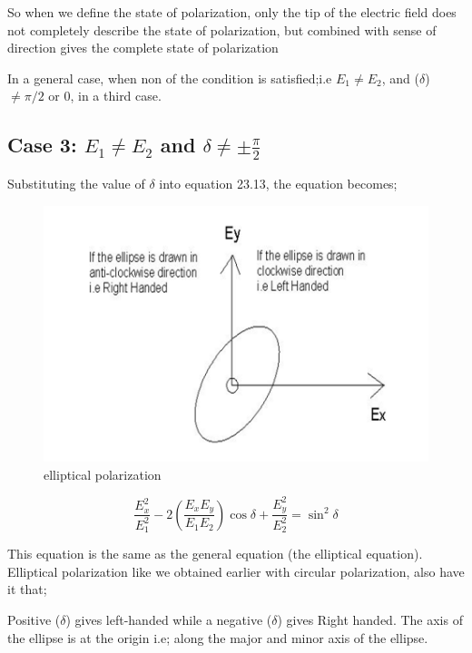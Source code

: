 So when we define the state of polarization, only the tip of the electric field does not completely describe the state of polarization, but combined with sense of direction gives the complete state of polarization

In a general case, when non of the condition is satisfied;i.e $ E_1 \neq E_2$, and ($\delta$)$ \neq \pi/2$ or $ 0 $, in a third case.

\subsection{Case 3: $ E_1 \neq E_2 $ and $\delta \neq \pm \frac{\pi}{2}$}
Substituting the value of $\delta$ into equation 23.13, the equation becomes;
\begin{figure}[h]
\centering
\includegraphics[width=.8\linewidth]{./graphics/ellipse}
\caption{elliptical polarization}
\end{figure}

\begin{equation}
\frac{E_{x}^2}{E_{1}^2} -2(\frac{E_{x}E_{y}}{E_{1}E_{2}})\cos\delta + \frac{E_{y}^2}{E_{2}^2} =\sin^2 \delta
\end{equation}

This equation is the same as the general equation (the elliptical equation). Elliptical polarization like we obtained earlier with circular polarization, also have it that;

Positive ($\delta$) gives left-handed while a negative ($\delta$) gives Right handed. The axis of the ellipse is at the origin i.e; along the major and minor axis of the ellipse.

